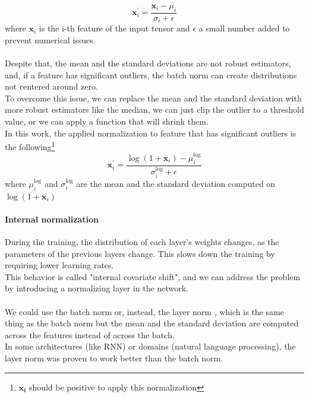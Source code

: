 \begin{equation}
    \bm{x}_i^{'}=\frac{\bm{x}_i-\mu_i}{\sigma_i+\epsilon}
\end{equation}
where $\bm{x}_i$ is the i-th feature of the input tensor and $\epsilon$ a small number added to prevent numerical issues.\\
\\
Despite that,  the mean and the standard deviations are not robust estimators, and, if a feature has significant outliers, the batch norm can create distributions not centered around zero.\\
To overcome this issue, we can replace the mean and the standard deviation with more robust estimators like the median, we can just clip the outlier to a threshold value, or we can apply a function that will shrink them.\\
In this work, the applied normalization to feature that has significant outliers is the following\footnote{$\bm{x_i}$ should be positive to apply this normalization}
\begin{equation}
    \bm{x}_i^{'}=\frac{\log \left(1+\bm{x}_i \right)-\mu_{i}^{\log}}{\sigma_i^{\log}+\epsilon}
\end{equation}
where $\mu_i^{\log}$ and $\sigma_i^{\log}$ are the mean and the standard deviation computed on $\log(1+\bm{x}_i)$

\paragraph*{Internal normalization}
During the training, the distribution of each layer’s weights changes, as the parameters of the previous layers change.
This slows down the training by requiring lower learning
rates. \\
This behavior is called "internal covariate
shift", and we can address the problem by introducing a normalizing layer in the network.\\
\\
We could use the batch norm or, instead, the layer norm \cite{Ba2016LayerNormalization}, which is the same thing as the batch norm but the mean and the standard deviation are computed across the features instead of across the batch.\\
In some architectures (like RNN) or domains (natural language processing), the layer norm was proven to work better than the batch norm.



